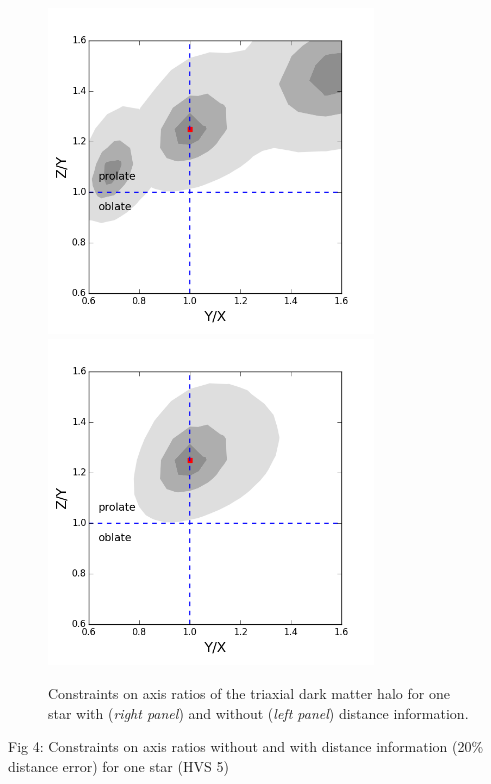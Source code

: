 \documentclass[iop]{emulateapj}
\begin{document}
\begin{figure}[t]
  \begin{minipage}{\hsize}
    \centering
    \includegraphics[width=3.4in]{axis_hvs5_nod.png}
    \includegraphics[width=3.4in]{axis_hvs5_d20.png}
  \end{minipage}
  \vspace{-0.2cm}
\caption{\small Constraints on axis ratios of the triaxial dark matter halo for one star with ({\it right panel}) and without ({\it left panel}) distance information.}
  \vspace{0.3cm}
  \label{fig:axis_hvs5}
\end{figure}

Fig 4: Constraints on axis ratios without and with distance information (20\% distance error) for one star (HVS 5)
\end{document}
